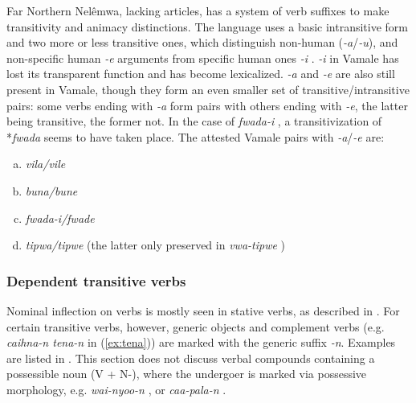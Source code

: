 Far Northern Nelêmwa, lacking articles, has a system of verb suffixes to make transitivity and animacy distinctions. The language uses a basic intransitive form and two more or less transitive ones, which distinguish non-human (\textit{-a}\slash\mbox{\textit{-u}}), and non-specific human \textit{-e} arguments  from specific human ones \textit{-i} \parencite[44]{bril_nelemwa_2002}. \textit{-i} in Vamale has lost its transparent function and has become lexicalized.  \textit{-a} and \textit{-e} are also still present in Vamale, though they form an even smaller set of transitive/intransitive pairs: some verbs ending with \textit{-a} form pairs with others ending with \textit{-e}, the latter being transitive, the former not. In the case of \textit{fwada-i} , a transitivization of *\textit{fwada} seems to have taken place. The attested Vamale pairs with \textit{-a}\slash\textit{-e} are: 

\begin{enumerate}[(a)]
	\item \textit{vila/vile}  
	\item \textit{buna/bune} 
	\item \textit{fwada-i/fwade} 
	\item \textit{tipwa/tipwe}  (the latter only preserved in \textit{vwa-tipwe} )
\end{enumerate}


\subsubsection{Dependent transitive verbs}
\label{ssec:active-n}
Nominal inflection on verbs is mostly seen in stative verbs, as described in . For certain transitive verbs, however, generic objects and complement verbs (e.g. \textit{caihna-n {\ob}tena-n{\cb}}\textsubscript{} in (\ref{ex:tena})) are marked with the generic suffix \textit{-n}. Examples are listed in . This section does not discuss verbal compounds containing a possessible noun (V + N-), where the undergoer is marked via possessive morphology, e.g. \textit{wai-nyoo-n}  , or	\textit{caa-pala-n}  . 

